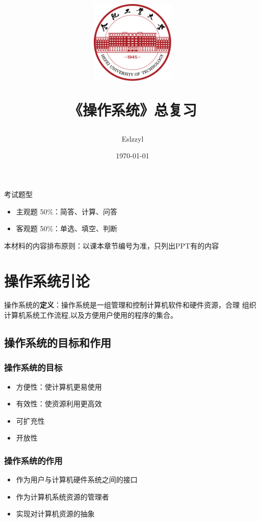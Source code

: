 \documentclass[12pt, a4paper, oneside]{ctexart}
\title{
    \includegraphics[width=0.3\textwidth]{images/hfut-badge.pdf}
    
    \vspace{20pt}
    《操作系统》总复习
}
\author{Eslzzyl}
\date{\today}
\begin{document}
\maketitle
\newpage
\tableofcontents
\vspace{20pt}
考试题型
\begin{itemize}
    \item 主观题 50\%：简答、计算、问答
    \item 客观题 50\%：单选、填空、判断
\end{itemize}
\vspace{20pt}
本材料的内容排布原则：以课本章节编号为准，只列出PPT有的内容

\newpage

\section{操作系统引论}

操作系统的\textbf{定义}：操作系统是一组管理和控制计算机软件和硬件资源，合理
组织计算机系统工作流程,以及方便用户使用的程序的集合。

\subsection{操作系统的目标和作用}

\subsubsection{操作系统的目标}

\begin{itemize}
    \item 方便性：使计算机更易使用
    \item 有效性：使资源利用更高效
    \item 可扩充性
    \item 开放性
\end{itemize}

\subsubsection{操作系统的作用}

\begin{itemize}
    \item 作为用户与计算机硬件系统之间的接口
    \item 作为计算机系统资源的管理者
    \item 实现对计算机资源的抽象
\end{itemize}
\end{document}
